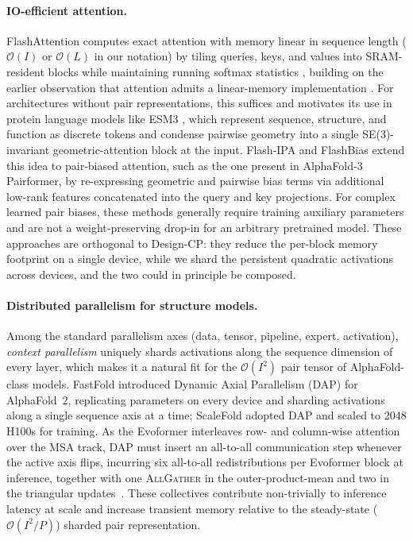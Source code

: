 \documentclass{article}
\theoremstyle{plain}
\theoremstyle{definition}
\theoremstyle{remark}
\begin{document}
\paragraph{IO-efficient attention.} FlashAttention \cite{dao_flashattention_2022, dao_flashattention-2_2023}
computes exact attention with memory linear in sequence length ($\mathcal{O}(I)$ or $\mathcal{O}(L)$ in our notation) by tiling queries, keys, and values into SRAM-resident blocks while maintaining running
softmax statistics \citep{milakov_online_2018}, building on the earlier observation that attention admits a linear-memory implementation \citep{rabe_self-attention_2022}. For architectures without pair representations, this suffices and motivates its use in protein language models like ESM3 \citep{hayes_simulating_2025}, which represent sequence, structure, and function as discrete tokens and condense pairwise geometry into a single SE(3)-invariant geometric-attention block at the input. Flash‑IPA \citep{liu_flash_2025} and FlashBias \citep{wu_flashbias_2025} extend this idea to pair‑biased attention, such as the one present in AlphaFold‑3 Pairformer, by re-expressing geometric and pairwise bias terms via additional low‑rank features concatenated into the query and key projections. For complex learned pair biases, these methods generally require training auxiliary parameters and are not a weight‑preserving drop‑in for an arbitrary pretrained model. These approaches are orthogonal to Design-CP: they reduce the per-block memory footprint on a single device, while we shard the persistent quadratic activations across devices, and the two could in principle be composed.

\paragraph{Distributed parallelism for structure models.} Among the standard parallelism axes (data, tensor, pipeline, expert, activation), \emph{context parallelism} uniquely shards activations along the sequence dimension of every layer, which makes it a natural fit for the $\mathcal{O}(I^2)$ pair tensor of AlphaFold-class models. FastFold \citep{cheng_fastfold_2023} introduced Dynamic Axial Parallelism (DAP) for AlphaFold~2, replicating parameters on every device and sharding activations along a single sequence axis at a time; ScaleFold \citep{zhu_scalefold_2024} adopted DAP and scaled to 2048 H100s for training. As the Evoformer interleaves row- and column-wise attention over the MSA track, DAP must insert an all-to-all communication step whenever the active axis flips, incurring six all-to-all redistributions per Evoformer block at inference, together with one \textsc{AllGather} in the outer-product-mean and two in the triangular updates~\citep{cheng_fastfold_2023}. These collectives contribute non-trivially to inference latency at scale and increase transient memory relative to the steady-state ($\mathcal{O}(I^2/P)$) sharded pair representation.
\end{document}
